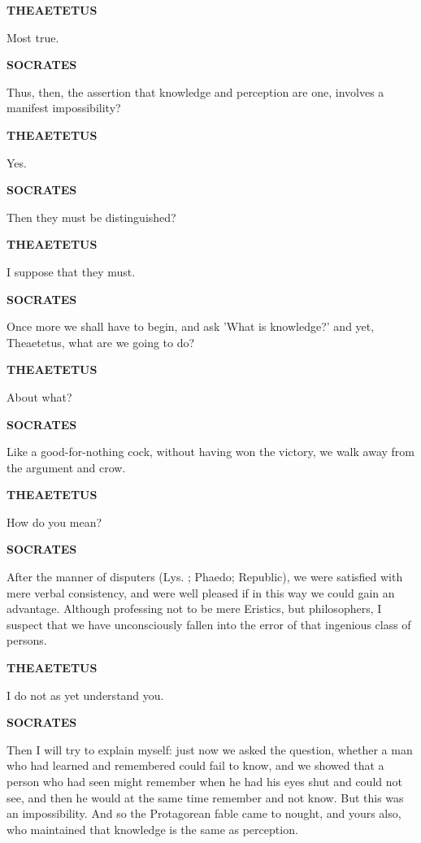 \documentclass[11pt,letter]{article}
\begin{document}
\par \textbf{THEAETETUS}
\par   Most true.

\par \textbf{SOCRATES}
\par   Thus, then, the assertion that knowledge and perception are one, involves a manifest impossibility?

\par \textbf{THEAETETUS}
\par   Yes.

\par \textbf{SOCRATES}
\par   Then they must be distinguished?

\par \textbf{THEAETETUS}
\par   I suppose that they must.

\par \textbf{SOCRATES}
\par   Once more we shall have to begin, and ask 'What is knowledge?' and yet, Theaetetus, what are we going to do?

\par \textbf{THEAETETUS}
\par   About what?

\par \textbf{SOCRATES}
\par   Like a good-for-nothing cock, without having won the victory, we walk away from the argument and crow.

\par \textbf{THEAETETUS}
\par   How do you mean?

\par \textbf{SOCRATES}
\par   After the manner of disputers (Lys. ; Phaedo; Republic), we were satisfied with mere verbal consistency, and were well pleased if in this way we could gain an advantage. Although professing not to be mere Eristics, but philosophers, I suspect that we have unconsciously fallen into the error of that ingenious class of persons.

\par \textbf{THEAETETUS}
\par   I do not as yet understand you.

\par \textbf{SOCRATES}
\par   Then I will try to explain myself:  just now we asked the question, whether a man who had learned and remembered could fail to know, and we showed that a person who had seen might remember when he had his eyes shut and could not see, and then he would at the same time remember and not know. But this was an impossibility. And so the Protagorean fable came to nought, and yours also, who maintained that knowledge is the same as perception.
\end{document}

